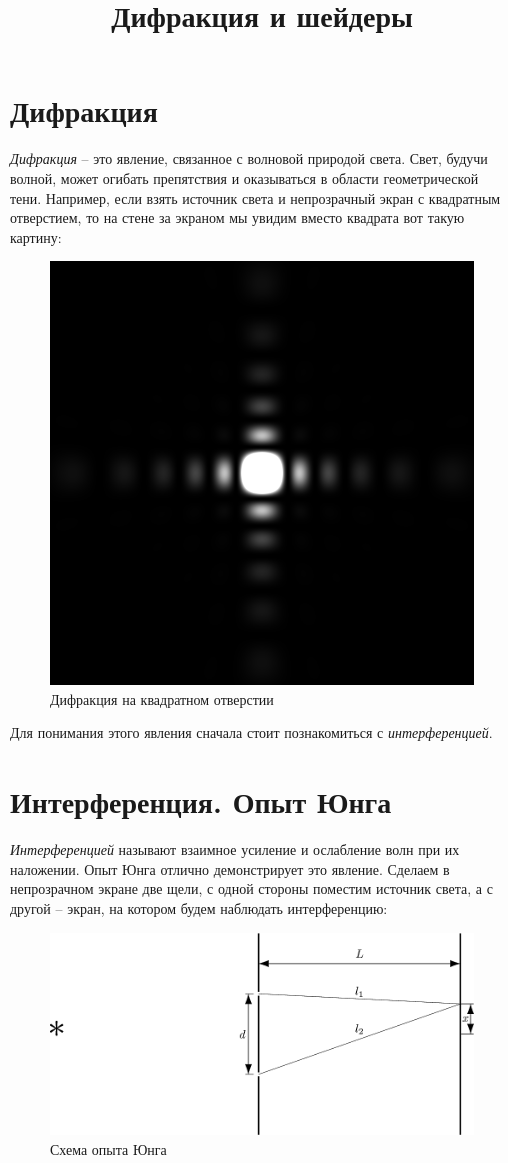 \documentclass{ncc}
\title{Дифракция и шейдеры}
\begin{document}
\maketitle
\tableofcontents

\section{Дифракция}

\textit{Дифракция} -- это явление, связанное с волновой природой света. Свет, будучи
волной, может огибать препятствия и оказываться в области геометрической тени.
Например, если взять источник света и непрозрачный экран с квадратным
отверстием, то на стене за экраном мы увидим вместо квадрата вот такую картину:
\begin{figure}[h!]
\center
\includegraphics[width=.35\textwidth]{2015-10-12-difraction-square.png}
\caption{Дифракция на квадратном отверстии}
\end{figure}

Для понимания этого явления сначала стоит познакомиться с \textit{интерференцией}.

\section{Интерференция. Опыт Юнга}
\textit{Интерференцией} называют взаимное усиление и ослабление волн при их наложении. Опыт Юнга отлично демонстрирует это
явление.
Сделаем в непрозрачном экране две щели, с одной стороны поместим источник света, а с другой -- экран, на котором будем наблюдать интерференцию:
\begin{figure}[h]
\center
\includegraphics[width=\textwidth]{2015-10-12-difraction-exp.png}
\caption{Схема опыта Юнга}
\end{figure}
\end{document}
